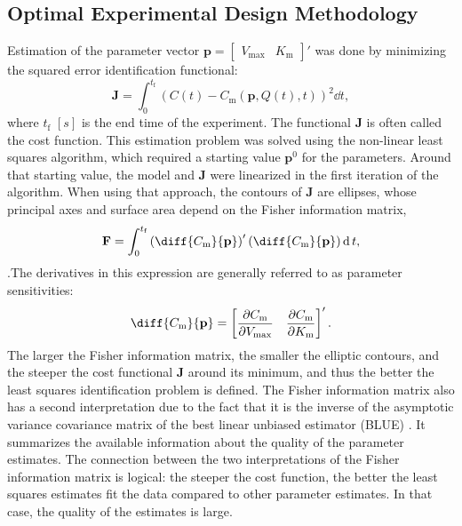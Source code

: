 \subsection{Optimal Experimental Design Methodology}
\label{Information}
Estimation of the parameter vector $\mathbf{p} = \begin{bmatrix}V_{\text{max}} & K_{\text{m}}\end{bmatrix}'$ was done by minimizing the squared error identification functional:
\begin{equation}
\mathbf{J} = \int_{0}^{t_\text{f}} (C(t) - C_\text{m}(\mathbf{p},Q(t),t))^2 \dd{t},
\label{J}
\end{equation}
where $t_\text{f}$ $[s]$ is the end time of the experiment. The functional $\mathbf{J}$ is often called the cost function.  This estimation problem was solved using the non-linear least squares algorithm, which required a starting value $\mathbf{p}^0$ for the parameters. Around that starting value, the model and $\mathbf{J}$ were linearized in the first iteration of the algorithm. When using that approach, the contours of $\mathbf{J}$ are ellipses, whose principal axes and surface area depend on the Fisher information matrix,
\begin{equation}
\mathbf{F} =  \int_{0}^{t_\text{f}}
\left(
\diff{C_\text{m}}{\mathbf{p}}
\right)'
\left(
\diff{C_\text{m}}{\mathbf{p}}
\right) \dd t,
\label{F}
\end{equation}
\parencite{fedorov}.The derivatives in this expression are generally referred to as parameter sensitivities:
\begin{equation}
\diff{C_\text{m}}{\mathbf{p}} =
\begin{bmatrix}
\dfrac{\partial C_\text{m}}{\partial V_{\text{max}}} & \dfrac{\partial C_\text{m}}{\partial K_{\text{m}}}
\end{bmatrix}'.
\end{equation}
The larger the Fisher information matrix, the smaller the elliptic contours, and the steeper the cost functional $\mathbf{J}$ around its minimum, and thus the better the least squares identification problem is defined. The Fisher information matrix also has a second interpretation due to the fact that it is the inverse of the asymptotic variance covariance matrix of the best linear unbiased estimator (BLUE)  \parencite{munack1}. It summarizes the available information about the quality of the parameter estimates. The connection between the two interpretations of the Fisher information matrix is logical: the steeper the cost function, the better the least squares estimates fit the data compared to other parameter estimates. In that case, the quality of the estimates is large.
